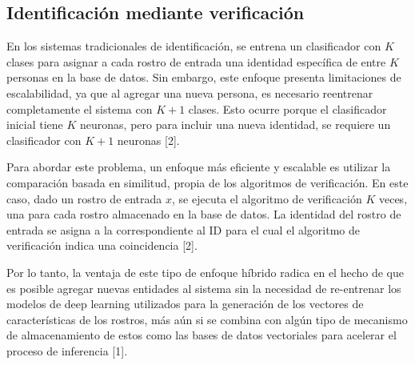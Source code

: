 \subsection{Identificación mediante verificación}
En los sistemas tradicionales de identificación, se entrena un clasificador con $K$ clases para asignar a cada rostro de entrada una identidad específica de entre $K$ personas en la base de datos. Sin embargo, este enfoque presenta limitaciones de escalabilidad, ya que al agregar una nueva persona, es necesario reentrenar completamente el sistema con $K+1$ clases. Esto ocurre porque el clasificador inicial tiene $K$ neuronas, pero para incluir una nueva identidad, se requiere un clasificador con $K+1$ neuronas [2].

\vspace{\baselineskip}

Para abordar este problema, un enfoque más eficiente y escalable es utilizar la comparación basada en similitud, propia de los algoritmos de verificación. En este caso, dado un rostro de entrada $x$, se ejecuta el algoritmo de verificación $K$ veces, una para cada rostro almacenado en la base de datos. La identidad del rostro de entrada se asigna a la correspondiente al ID para el cual el algoritmo de verificación indica una coincidencia [2].

Por lo tanto, la ventaja de este tipo de enfoque híbrido radica en el hecho de que es posible agregar nuevas entidades al sistema sin la necesidad de re-entrenar los modelos de deep learning utilizados para la generación de los vectores de características de los rostros, más aún si se combina con algún tipo de mecanismo de almacenamiento de estos como las bases de datos vectoriales para acelerar el proceso de inferencia [1].





